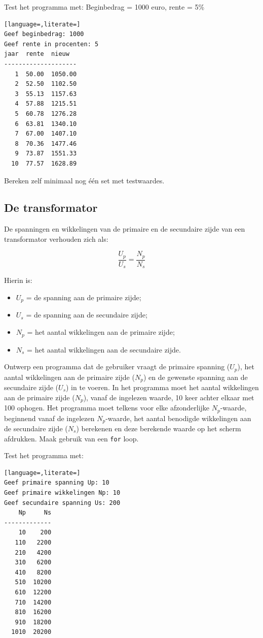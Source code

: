 \documentclass[a4paper,10pt,fleqn,twoside]{article}
\begin{document}
Test het programma met: Beginbedrag = 1000 euro, rente = 5\%

\begin{lstlisting}[language=,literate=]
Geef beginbedrag: 1000
Geef rente in procenten: 5
jaar  rente  nieuw
--------------------
   1  50.00  1050.00
   2  52.50  1102.50
   3  55.13  1157.63
   4  57.88  1215.51
   5  60.78  1276.28
   6  63.81  1340.10
   7  67.00  1407.10
   8  70.36  1477.46
   9  73.87  1551.33
  10  77.57  1628.89
\end{lstlisting}

Bereken zelf minimaal nog één set met testwaardes.

\subsection{De transformator}
De spanningen en wikkelingen van de primaire en de secundaire zijde van een transformator verhouden zich als:

\begin{equation*}
\dfrac{U_p}{U_s} = \dfrac{N_p}{N_s}
\end{equation*}

Hierin is:
\begin{itemize}
\item $U_p$ = de spanning aan de primaire zijde;
\item $U_s$ = de spanning aan de secundaire zijde;
\item $N_p$ = het aantal wikkelingen aan de primaire zijde;
\item $N_s$ = het aantal wikkelingen aan de secundaire zijde.
\end{itemize}

Ontwerp een programma dat de gebruiker vraagt de primaire spanning ($U_p$), het aantal wikkelingen aan de primaire zijde ($N_p$) en de gewenste spanning aan de secundaire zijde ($U_s$) in te voeren. In het programma moet het aantal wikkelingen aan de primaire zijde ($N_p$), vanaf de ingelezen waarde, 10 keer achter elkaar met 100 ophogen. Het programma moet telkens voor elke afzonderlijke $N_p$-waarde, beginnend vanaf de ingelezen $N_p$-waarde, het aantal benodigde wikkelingen aan de secundaire zijde ($N_s$) berekenen en deze berekende waarde op het scherm afdrukken. Maak gebruik van een \lstinline|for| loop.

Test het programma met:

\begin{lstlisting}[language=,literate=]
Geef primaire spanning Up: 10
Geef primaire wikkelingen Np: 10
Geef secundaire spanning Us: 200
    Np     Ns
-------------
    10    200
   110   2200
   210   4200
   310   6200
   410   8200
   510  10200
   610  12200
   710  14200
   810  16200
   910  18200
  1010  20200
\end{lstlisting}
\end{document}
